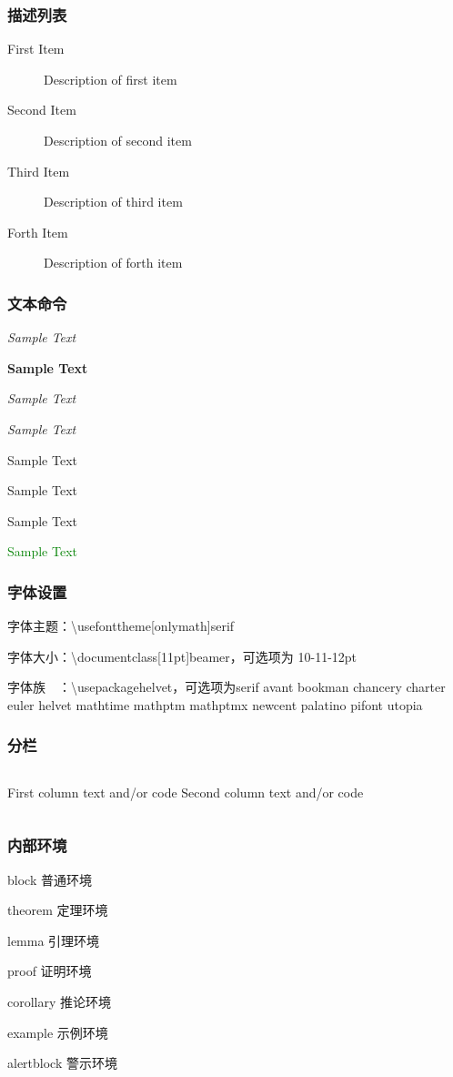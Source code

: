 \documentclass{beamer}
\begin{document}
	\begin{frame}[c]
		\frametitle{描述列表}
		\begin{description}
			\item[First Item] Description of first item
			\item[Second Item] Description of second item
			\item[Third Item] Description of third item
			\item[Forth Item] Description of forth item
		\end{description}
	\end{frame}

	\begin{frame}[c]
		\frametitle{文本命令}
		\emph{Sample Text}
		
		\textbf{Sample Text}
		
		\textit{Sample Text}
		
		\textsl{Sample Text}
		
		\alert{Sample Text}
		
		\textrm{Sample Text}
		
		\textsf{Sample Text}
		
		\textcolor{green}{Sample Text}
		
	\end{frame}

	\begin{frame}[c] 
		\frametitle{字体设置}
		字体主题：\textbackslash usefonttheme[onlymath]{serif}
		
		字体大小：\textbackslash documentclass[11pt]{beamer}，可选项为 10-11-12pt
		
		字体族　：\textbackslash usepackage{helvet}，可选项为serif avant bookman chancery charter
		euler helvet mathtime mathptm mathptmx
		newcent palatino pifont utopia
	\end{frame}


	\begin{frame}[c] 	
		\frametitle{分栏}
		\begin{columns}
			First column text and/or code
			Second column text and/or code
		\end{columns}
	\end{frame}


	\begin{frame}[c] 	
		\frametitle{内部环境}
		block 普通环境
		
		theorem 定理环境
		
		lemma 引理环境
		
		proof 证明环境
		
		corollary 推论环境
		
		example 示例环境
		
		alertblock 警示环境
	\end{frame}
\end{document}

